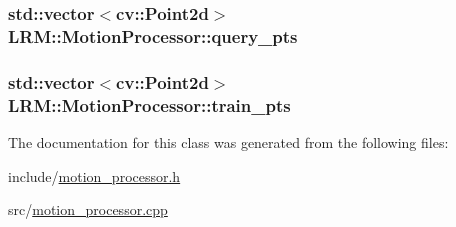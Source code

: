 \hypertarget{classLRM_1_1MotionProcessor_af0e2f9ee5479177b49a6caf44962faff}{
\subsubsection[{query\-\_\-pts}]{\setlength{\rightskip}{0pt plus 5cm}std\-::vector$<$cv\-::\-Point2d$>$ {\bf \-L\-R\-M\-::\-Motion\-Processor\-::query\-\_\-pts}}}\label{classLRM_1_1MotionProcessor_af0e2f9ee5479177b49a6caf44962faff}
\hypertarget{classLRM_1_1MotionProcessor_ae72b3aea2c352caefb7f256a40ca6e31}{
\subsubsection[{train\-\_\-pts}]{\setlength{\rightskip}{0pt plus 5cm}std\-::vector$<$cv\-::\-Point2d$>$ {\bf \-L\-R\-M\-::\-Motion\-Processor\-::train\-\_\-pts}}}\label{classLRM_1_1MotionProcessor_ae72b3aea2c352caefb7f256a40ca6e31}


\-The documentation for this class was generated from the following files\-:\begin{DoxyCompactItemize}
\item 
include/\hyperlink{motion__processor_8h}{motion\-\_\-processor.\-h}\item 
src/\hyperlink{motion__processor_8cpp}{motion\-\_\-processor.\-cpp}\end{DoxyCompactItemize}
